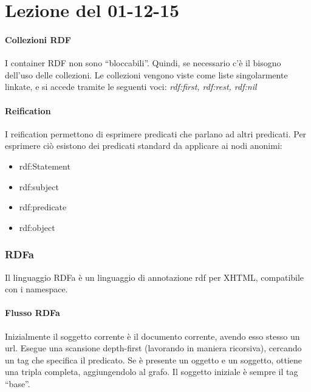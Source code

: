 \section{Lezione del 01-12-15}
\graphicspath{ {res/data/01-12-15/} }

\paragraph*{Collezioni RDF}

I container RDF non sono ``bloccabili''. Quindi, se necessario c'\`e il bisogno dell'uso delle collezioni. Le collezioni vengono viste come liste singolarmente linkate, e si accede tramite le seguenti voci: \textit{rdf:first, rdf:rest, rdf:nil}

\paragraph*{Reification}

I reification permettono di esprimere predicati che parlano ad altri predicati. Per esprimere ci\`o esistono dei predicati standard da applicare ai nodi anonimi:
\begin{itemize}

\item rdf:Statement
\item rdf:subject
\item rdf:predicate
\item rdf:object

\end{itemize}

\subsubsection{RDFa}

Il linguaggio RDFa \`e un linguaggio di annotazione rdf per XHTML, compatibile con i namespace.

\paragraph*{Flusso RDFa}Inizialmente il soggetto corrente \`e il documento corrente, avendo esso stesso un url. Esegue una scansione depth-first (lavorando in maniera ricorsiva), cercando un tag che specifica il predicato. Se \`e presente un oggetto e un soggetto, ottiene una tripla completa, aggiungendolo al grafo. Il soggetto iniziale \`e sempre il tag ``base''. \newline

